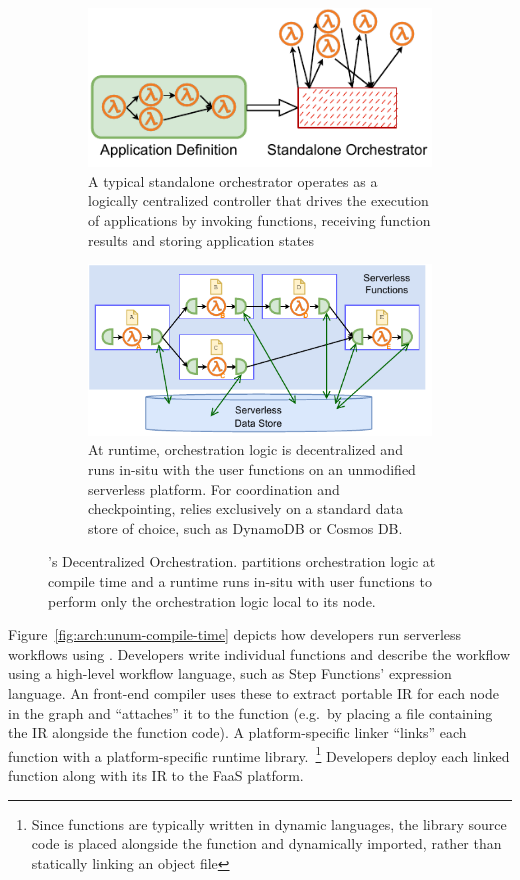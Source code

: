\begin{figure}[t!]
\begin{subfigure}[t]{0.8\textwidth}
	\end{subfigure}
	\begin{subfigure}[b]{\columnwidth}
		\centering
		\includegraphics[width=0.8\columnwidth]{figures/unum-arch-centralized.pdf}
    \caption{A typical standalone orchestrator operates as a logically
    centralized controller that drives the execution of applications by
    invoking functions, receiving function results and storing application
    states}
    \label{fig:arch:centralized}
	\end{subfigure}
	\hfill
	\begin{subfigure}[b]{\columnwidth}
		\centering
		\includegraphics[width=.7\columnwidth]{figures/unum-arch-runtime.pdf}
		\caption{At runtime, \name{} orchestration logic is decentralized and
			runs in-situ with the user functions on an unmodified serverless
			platform. For coordination and checkpointing,
			\name{} relies exclusively on a standard data store of choice, such
			as DynamoDB or Cosmos DB.}
		\label{fig:arch:unum-runtime}
	\end{subfigure}
	\caption{\name{}'s Decentralized Orchestration. \name{} partitions
	orchestration logic at compile time and a \name{} runtime runs in-situ
	with user functions to perform only the orchestration logic local to its
	node.}
	\label{fig:arch}
\end{figure}

Figure~\ref{fig:arch:unum-compile-time} depicts how developers run serverless
workflows using \name{}. Developers write individual functions and describe the
workflow using a high-level workflow language, such as Step Functions'
expression language. An \name{} front-end compiler uses these to extract
portable \name{} IR for each node in the graph and ``attaches'' it to the
function (e.g.\ by placing a file containing the IR alongside the function
code). A platform-specific \name{} linker ``links'' each function with a
platform-specific \name{} runtime library.~\footnote{Since functions are
typically written in dynamic languages, the \name{} library source code is
placed alongside the function and dynamically imported, rather than statically
linking an object file} Developers deploy each linked function along with its IR
to the FaaS platform.


